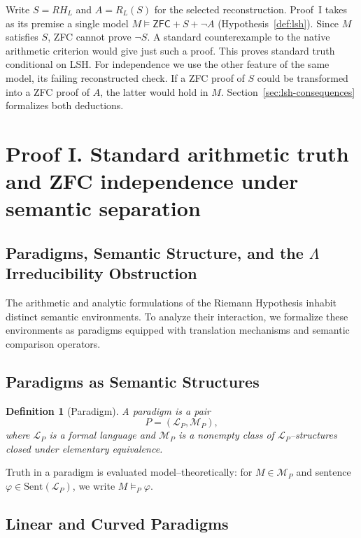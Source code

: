 \documentclass{article}
\newtheorem{definition}[theorem]{Definition}
\theoremstyle{definition}
\begin{document}
Write $S=RH_L$ and $A=R_L(S)$ for the selected reconstruction.
Proof~I takes as its premise a single model $M\models\mathsf{ZFC}+S+\neg A$
(Hypothesis~\ref{def:lsh}). Since $M$ satisfies $S$, ZFC cannot prove
$\neg S$. A standard counterexample to the native arithmetic criterion
would give just such a proof. This proves standard truth conditional on LSH.
For independence we use the other feature of the same model, its failing
reconstructed check. If a ZFC proof of $S$ could be transformed into a ZFC
proof of $A$, the latter would hold in $M$. Section~\ref{sec:lsh-consequences}
formalizes both deductions.

\section{Proof I. Standard arithmetic truth and ZFC independence under semantic separation}

\subsection{Paradigms, Semantic Structure, and the \texorpdfstring{$\Lambda$}{Lambda} Irreducibility Obstruction}

The arithmetic and analytic formulations of the Riemann Hypothesis inhabit
distinct semantic environments.  To analyze their interaction, we formalize
these environments as paradigms equipped with translation mechanisms and
semantic comparison operators.

\subsection{Paradigms as Semantic Structures}

\begin{definition}[Paradigm]
A \emph{paradigm} is a pair
\[
P = (\mathcal{L}_P,\mathcal{M}_P),
\]
where $\mathcal{L}_P$ is a formal language and $\mathcal{M}_P$ is a nonempty
class of $\mathcal{L}_P$--structures closed under elementary equivalence.
\end{definition}

Truth in a paradigm is evaluated model--theoretically:
for $M\in\mathcal{M}_P$ and sentence $\varphi\in\mathrm{Sent}(\mathcal{L}_P)$,
we write $M\models_P\varphi$.

\subsection{Linear and Curved Paradigms}
\end{document}
